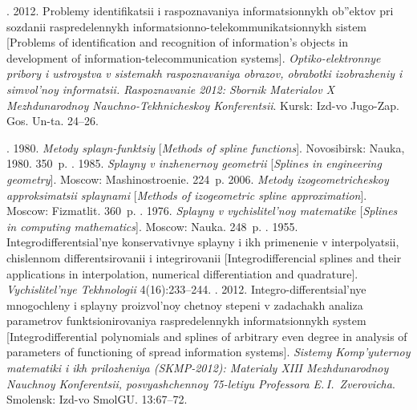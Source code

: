 




  \begin{multicols}{2}

\renewcommand{\bibname}{\protect\rmfamily References}

{\small\frenchspacing
{%
\begin{thebibliography}{9}

.
2012. 
Problemy identifikatsii i raspoznavaniya informatsionnykh ob''ektov pri 
sozdanii raspredelennykh informatsionno-telekommunikatsionnykh sistem 
[Problems of identification and recognition of information's objects 
in development of information-telecommunication systems].
\textit{Optiko-elektronnye pribory i ustroystva v sistemakh raspoznavaniya obrazov, 
obrabotki izobrazheniy i simvol'noy informatsii.  
Raspoznavanie 2012: Sbornik Materialov X Mezhdunarodnoy Nauchno-Tekhnicheskoy Kon\-fe\-ren\-tsii}. 
Kursk: Izd-vo Jugo-Zap. Gos. Un-ta. 24--26. 

.  
1980. \textit{Metody splayn-funktsiy} [\textit{Methods of spline functions}].
Novosibirsk: Nauka, 1980. 350~p.
.
1985. \textit{Splayny v inzhenernoy geometrii} 
[\textit{Splines in engineering geometry}]. Moscow: Mashinostroenie. 224~p.
2006. \textit{Metody izogeometricheskoy approk\-si\-ma\-tsii splaynami} 
[\textit{Methods of izogeometric spline approximation}].  Moscow: Fizmatlit. 360~p.
.
1976. \textit{Splayny v vychislitel'noy matematike}
[\textit{Splines in computing mathematics}]. 
Moscow: Nauka. 248~p.
.  
1955. Integro\-dif\-fe\-ren\-tsi\-al'nye  konservativnye splayny i ikh primenenie v in\-ter\-po\-lya\-tsii,  
chislennom differentsirovanii i integrirovanii 
[Integrodifferencial splines and their applications in interpolation, 
numerical differentiation and quadrature]. \textit{Vychislitel'nye Tekhnologii}
 4(16):233--244. 
. 2012.
Integro-differentsial'nye mnogochleny i splay\-ny proizvol'noy chetnoy stepeni 
v zadachakh ana\-li\-za parametrov funktsionirovaniya raspredelennykh informatsionnykh system 
[Integrodifferential polynomials and splines of arbitrary even degree in analysis of 
parameters of functioning of spread information systems].  \textit{Sistemy Komp'yuternoy 
matematiki i ikh prilozheniya (SKMP-2012): Materialy XIII Mezhdunarodnoy Nauchnoy Kon\-fe\-ren\-tsii, 
posvyashchennoy 75-letiyu Professora E.\,I.~Zverovicha}. 
Smolensk: Izd-vo SmolGU. 13:67--72. 


\end{thebibliography}}}
\end{multicols}
